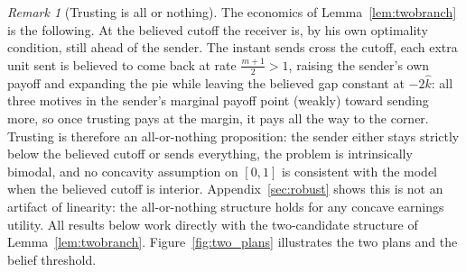 \documentclass[11pt]{article}
\theoremstyle{plain}
\theoremstyle{remark}
\newtheorem{remark}{Remark}
\begin{document}
\begin{remark}[Trusting is all or nothing]
The economics of Lemma~\ref{lem:twobranch} is the following.  At the believed cutoff the receiver is, by his own optimality condition, still ahead of the sender.  The instant sends cross the cutoff, each extra unit sent is believed to come back at rate $\tfrac{m+1}2>1$, raising the sender's own payoff and expanding the pie while leaving the believed gap constant at $-2\hat k$: all three motives in the sender's marginal payoff point (weakly) toward sending more, so once trusting pays at the margin, it pays all the way to the corner.  Trusting is therefore an all-or-nothing proposition: the sender either stays strictly below the believed cutoff or sends everything, the problem is intrinsically bimodal, and no concavity assumption on $[0,1]$ is consistent with the model when the believed cutoff is interior.  Appendix~\ref{sec:robust} shows this is not an artifact of linearity: the all-or-nothing structure holds for any concave earnings utility.  All results below work directly with the two-candidate structure of Lemma~\ref{lem:twobranch}.  Figure~\ref{fig:two_plans} illustrates the two plans and the belief threshold.
\end{remark}
\end{document}
